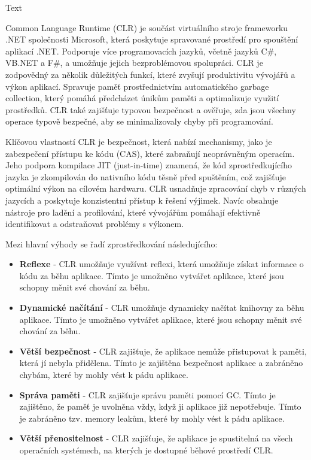 Text


Common Language Runtime (CLR) je součást virtuálního stroje frameworku .NET společnosti Microsoft, která poskytuje spravované prostředí pro spouštění aplikací .NET. Podporuje více programovacích jazyků, včetně jazyků C\#, VB.NET a F\#, a umožňuje jejich bezproblémovou spolupráci. CLR je zodpovědný za několik důležitých funkcí, které zvyšují produktivitu vývojářů a výkon aplikací. Spravuje paměť prostřednictvím automatického garbage collection, který pomáhá předcházet únikům paměti a optimalizuje využití prostředků. CLR také zajišťuje typovou bezpečnost a ověřuje, zda jsou všechny operace typově bezpečné, aby se minimalizovaly chyby při programování.

Klíčovou vlastností CLR je bezpečnost, která nabízí mechanismy, jako je zabezpečení přístupu ke kódu (CAS), které zabraňují neoprávněným operacím. Jeho podpora kompilace JIT (just-in-time) znamená, že kód zprostředkujícího jazyka je zkompilován do nativního kódu těsně před spuštěním, což zajišťuje optimální výkon na cílovém hardwaru. CLR usnadňuje zpracování chyb v různých jazycích a poskytuje konzistentní přístup k řešení výjimek. Navíc obsahuje nástroje pro ladění a profilování, které vývojářům pomáhají efektivně identifikovat a odstraňovat problémy s výkonem.


Mezi hlavní výhody se řadí zprostředkování následujícího:
\begin{itemize}
    \item  \textbf{Reflexe} - CLR umožňuje využívat reflexi, která umožňuje získat informace o kódu za běhu aplikace. Tímto je umožněno vytvářet aplikace, které jsou schopny měnit své chování za běhu.
    \item \textbf{Dynamické načítání} - CLR umožňuje dynamicky načítat knihovny za běhu aplikace. Tímto je umožněno vytvářet aplikace, které jsou schopny měnit své chování za běhu.
    \item \textbf{Větší bezpečnost} - CLR zajišťuje, že aplikace nemůže přistupovat k paměti, která jí nebyla přidělena. Tímto je zajištěna bezpečnost aplikace a zabráněno chybám, které by mohly vést k pádu aplikace.
    \item \textbf{Správa paměti} - CLR zajišťuje správu paměti pomocí GC. Tímto je zajištěno, že paměť je uvolněna vždy, když ji aplikace již nepotřebuje. Tímto je zabráněno tzv. memory leakům, které by mohly vést k pádu aplikace.
    \item \textbf{Větší přenositelnost} - CLR zajišťuje, že aplikace je spustitelná na všech operačních systémech, na kterých je dostupné běhové prostředí CLR.
\end{itemize}

